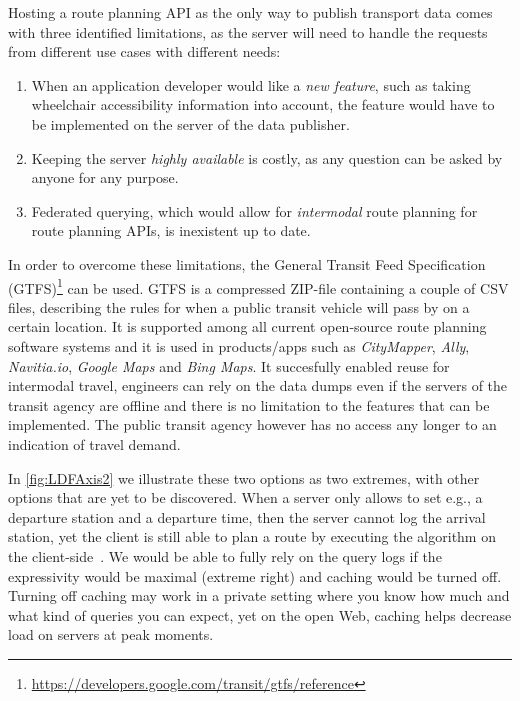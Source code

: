 \documentclass{sig-alternate}
\begin{document}
Hosting a route planning API as the only way to publish transport data comes with three identified limitations, as the server will need to handle the requests from different use cases with different needs:
\begin{enumerate}
  \item When an application developer would like a \emph{new feature}, such as taking wheelchair accessibility information into account, the feature would have to be implemented on the server of the data publisher.
  \item Keeping the server \emph{highly available} is costly, as any question can be asked by anyone for any purpose.
  \item Federated querying, which would allow for \emph{intermodal} route planning for route planning APIs, is inexistent up to date.
\end{enumerate}

In order to overcome these limitations, the General Transit Feed Specification (GTFS)\footnote{\url{https://developers.google.com/transit/gtfs/reference}} can be used. 
GTFS is a compressed ZIP-file containing a couple of CSV files, describing the rules for when a public transit vehicle will pass by on a certain location.
It is supported among all current open-source route planning software systems and it is used in products/apps such as \emph{CityMapper}, \emph{Ally}, \emph{Navitia.io}, \emph{Google Maps} and \emph{Bing Maps}.
It succesfully enabled reuse for intermodal travel, engineers can rely on the data dumps even if the servers of the transit agency are offline and there is no limitation to the features that can be implemented.
The public transit agency however has no access any longer to an indication of travel demand.

In \cref{fig:LDFAxis2} we illustrate these two options as two extremes, with other options that are yet to be discovered.
When a server only allows to set e.g., a departure station and a departure time, then the server cannot log the arrival station, yet the client is still able to plan a route by executing the algorithm on the client-side~\cite{lc}.
We would be able to fully rely on the query logs if the expressivity would be maximal (extreme right) and caching would be turned off. 
Turning off caching may work in a private setting where you know how much and what kind of queries you can expect, yet on the open Web, caching helps decrease load on servers at peak moments.
\end{document}
